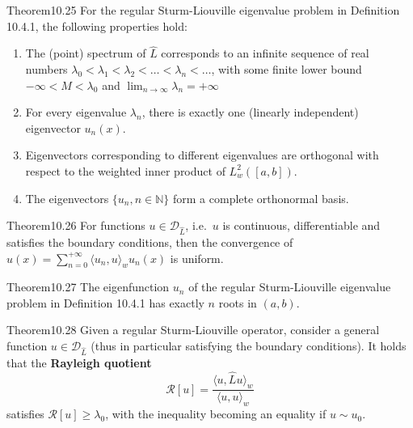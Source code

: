 \begin{res}{Theorem}{10.25}
For the regular Sturm-Liouville eigenvalue problem in Definition 10.4.1, the following properties hold:
\begin{enumerate}
\item The (point) spectrum of $\hat L$ corresponds to an infinite sequence of real numbers $\lambda_0<\lambda_1<\lambda_2<\ldots<\lambda_n<\ldots$, with some finite lower bound $-\infty<M<\lambda_0$ and $\lim_{n\to\infty}\lambda_n=+\infty$
\item For every eigenvalue $\lambda_n$, there is exactly one (linearly independent) eigenvector $u_n(x)$.
\item Eigenvectors corresponding to different eigenvalues are orthogonal with respect to the weighted inner product of $L^2_w([a,b])$.
\item The eigenvectors $\{u_n,n\in\mathbb N\}$ form a complete orthonormal basis.
\end{enumerate}
\end{res}

\begin{res}{Theorem}{10.26}
For functions $u\in\mathcal D_{\hat L}$, i.e.\ $u$ is continuous, differentiable and satisfies the boundary conditions, then the convergence of $u(x)=\sum_{n=0}^{+\infty}\langle u_n,u\rangle_wu_n(x)$ is uniform.
\end{res}

\begin{res}[Oscillation]{Theorem}{10.27}
The eigenfunction $u_n$ of the regular Sturm-Liouville eigenvalue problem in Definition 10.4.1 has exactly $n$ roots in $(a,b)$.
\end{res}

\begin{res}{Theorem}{10.28}
Given a regular Sturm-Liouville operator, consider a general function $u\in\mathcal D_{\hat L}$ (thus in particular satisfying the boundary conditions). It holds that the \textbf{Rayleigh quotient}
\begin{equation}\mathcal R[u]=\frac{\langle u,\hat Lu\rangle_w}{\langle u,u\rangle_w}\tag{10.134}\end{equation}
satisfies $\mathcal R[u]\ge\lambda_0$, with the inequality becoming an equality if $u\sim u_0$.
\end{res}

